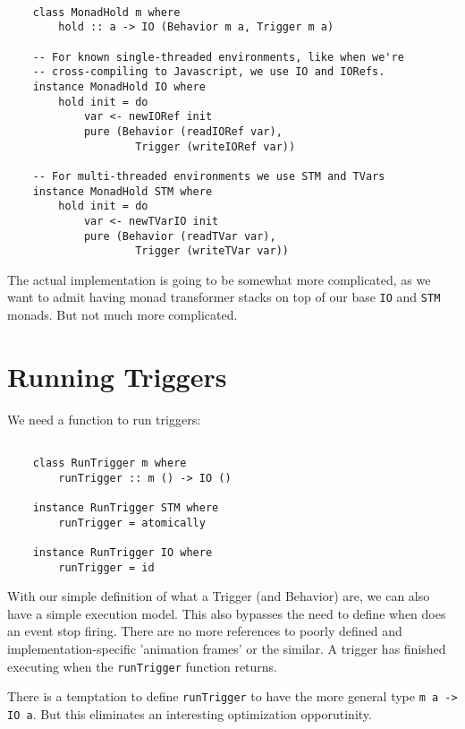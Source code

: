 \documentclass{article}
\begin{document}
\begin{verbatim}

    class MonadHold m where
        hold :: a -> IO (Behavior m a, Trigger m a)

    -- For known single-threaded environments, like when we're
    -- cross-compiling to Javascript, we use IO and IORefs.
    instance MonadHold IO where
        hold init = do
            var <- newIORef init
            pure (Behavior (readIORef var),
                    Trigger (writeIORef var))

    -- For multi-threaded environments we use STM and TVars
    instance MonadHold STM where
        hold init = do
            var <- newTVarIO init
            pure (Behavior (readTVar var),
                    Trigger (writeTVar var))

\end{verbatim}

The actual implementation is going to be somewhat more complicated, as
we want to admit having monad transformer stacks on top of our base
\verb|IO| and \verb|STM| monads.  But not much more complicated.

\section{Running Triggers}

We need a function to run triggers:

\begin{verbatim}

    class RunTrigger m where
        runTrigger :: m () -> IO ()

    instance RunTrigger STM where
        runTrigger = atomically

    instance RunTrigger IO where
        runTrigger = id

\end{verbatim}

With our simple definition of what a Trigger (and Behavior) are, we can
also have a simple execution model.  This also bypasses the need to
define when does an event stop firing.  There are no more references to
poorly defined and implementation-specific 'animation frames' or the
similar.  A trigger has finished executing when the \verb|runTrigger|
function returns.

There is a temptation to define \verb|runTrigger| to have the more
general type \verb|m a -> IO a|.  But this eliminates an interesting
optimization opporutinity.
\end{document}
